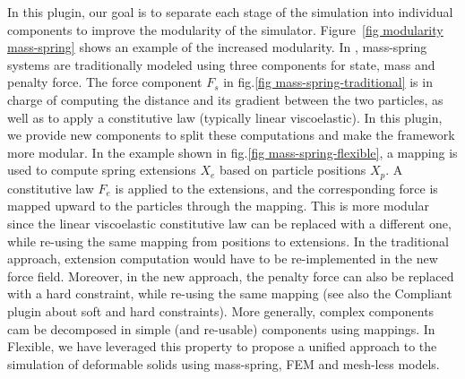 In this plugin, our goal is to separate each stage of the simulation into individual components to improve the modularity of the simulator.
Figure~\ref{fig modularity mass-spring} shows an example of the increased modularity.
In \sofa{}, mass-spring systems are traditionally modeled using three components for  state, mass and penalty force. 
The force component $F_s$ in fig.\ref{fig mass-spring-traditional} is in charge of computing the distance and its gradient between the two particles, as well as to apply a constitutive law (typically linear viscoelastic).
In this plugin, we provide new components to split these computations and make the framework more modular.
In the example shown in fig.\ref{fig mass-spring-flexible}, a mapping is used to compute spring extensions $X_e$ based on particle positions $X_p$. 
A constitutive law $F_e$ is applied to the extensions, and the corresponding force is mapped upward to the particles through the mapping.
This is more modular since the linear viscoelastic constitutive law can be replaced with a different one, while re-using the same mapping from positions to extensions. In the traditional approach, extension computation would have to be re-implemented in the new force field.
Moreover, in the new approach, the penalty force can also be replaced with a hard constraint, while re-using the same mapping (see also the Compliant plugin about soft and hard constraints).
More generally, complex components cam be decomposed in simple (and re-usable) components using  mappings.
In Flexible, we have leveraged this property to propose a unified approach to the simulation of deformable solids using mass-spring, FEM and mesh-less models.
